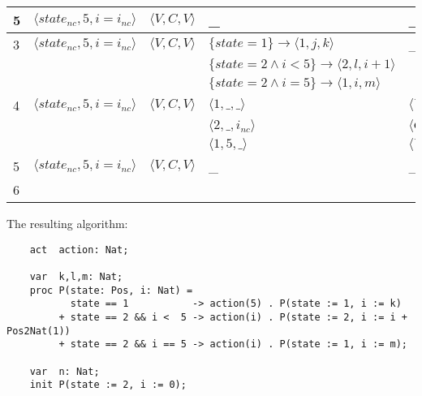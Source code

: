 \documentclass[a4paper,9pt]{article}
\begin{document}
\begin{tabular}{|l|l|l|l|l|l|}
\hline
5	&$\langle state_{nc},5,i=i_{nc}\rangle$	& $\langle V,C,V\rangle$	& \_										& \_				& $ state = state_{nc}, i=i_{nc}, j=5, k=\_, l=\_, m=\_, n=\_$ \\
\hline
3	&$\langle state_{nc},5,i=i_{nc}\rangle$	& $\langle V,C,V\rangle$	& $\{state=1\}\rightarrow \langle 1, j, k \rangle$				& \_				& $ state = state_{nc}, i=i_{nc}, j=5, k=\_, l=\_, m=\_, n=\_$ \\
	&					&				& $\{state=2 \wedge i < 5 \} \rightarrow \langle 2, l , i+1 \rangle$		& 				& \\
	&					&				& $\{state=2 \wedge i =5 \} \rightarrow \langle 1, i, m \rangle$		& 				& \\
\hline
4	&$\langle state_{nc},5,i=i_{nc}\rangle$	& $\langle V,C,V\rangle$	& $\langle 1,\_,\_ \rangle $							& $\langle V,C,V\rangle$	& $ \bullet state=state_{nc}, i=i_{nc}, j=\_, k=\_, l=\_, m=\_, n=\_$ \\ 
	&					&				& $\langle 2,\_,i_{nc}\rangle$							& $\langle C,C,V\rangle$	& $ \bullet state=state_{nc}, i=i_{nc}, j=\_, k=\_, l=\_, m=\_, n=\_$ \\
	&					&				& $\langle 1,5,\_\rangle$							& $\langle V,C,C\rangle$	& $ \bullet state=state_{nc}, i=i_{nc}, j=5, k=\_, l=\_, m=\_, n=\_$ \\
\hline
5	&$\langle state_{nc},5,i=i_{nc}\rangle$	& $\langle V,C,V\rangle$	& \_										& \_				& $ state = state_{n}, i=i_{nc}, j=5, k=\_, l=\_, m=\_, n=\_$ \\
\hline
6	&					&				&										&				&  subtitute \verb"j:=5" and remove \verb"j" \\
\hline	
\end{tabular}
The resulting algorithm:
\begin{verbatim}
    act  action: Nat;

    var  k,l,m: Nat;
    proc P(state: Pos, i: Nat) =
           state == 1           -> action(5) . P(state := 1, i := k)
         + state == 2 && i <  5 -> action(i) . P(state := 2, i := i + Pos2Nat(1))
         + state == 2 && i == 5 -> action(i) . P(state := 1, i := m);

    var  n: Nat;
    init P(state := 2, i := 0);
\end{verbatim}
\end{document}
